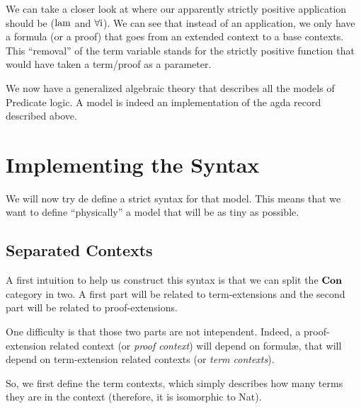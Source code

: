 \documentclass[10pt,a4paper]{article}
\begin{document}
			We can take a closer look at where our apparently strictly positive application should be ($\operatorname{lam}$ and $\operatorname{\operatorname{\forall i}}$). We can see that instead of an application, we only have a formula (or a proof) that goes from an extended context to a base contexts. This \enquote{removal} of the term variable stands for the strictly positive function that would have taken a term/proof as a parameter.
	
			\begin{tcolorbox}
				\vspace{-2ex}
				\agdasep
				\agdasep
				\agdasep
				\agdasep
				\vspace{-7.5ex}
			\end{tcolorbox}
		
			We now have a generalized algebraic theory that describes all the models of Predicate logic. A model is indeed an implementation of the agda record described above.
			
	\section{Implementing the Syntax}
	
		We will now try de define a strict syntax for that model. This means that we want to define \enquote{physically} a model that will be as tiny as possible.
		
		\subsection{Separated Contexts}
		
			A first intuition to help us construct this syntax is that we can split the $\textbf{Con}$ category in two. A first part will be related to term-extensions and the second part will be related to proof-extensions.
			
			One difficulty is that those two parts are not intependent. Indeed, a proof-extension related context (or \emph{proof context}) will depend on formulæ, that will depend on term-extension related contexts (or \emph{term contexts}).
		
			So, we first define the term contexts, which simply describes how many terms they are in the context (therefore, it is isomorphic to Nat).
			\begin{tcolorbox}
				\vspace{-2ex}
				\agda{agda/ICont.tex}
				\vspace{-7.5ex}
			\end{tcolorbox}
		
\end{document}
